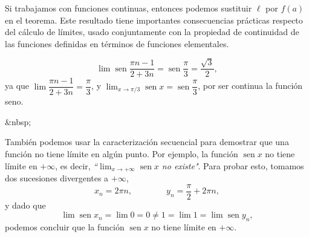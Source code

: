 Si trabajamos con funciones continuas, entonces podemos sustituir $\ell$ por $f(a)$ en el teorema.
Este resultado tiene importantes consecuencias prácticas respecto del cálculo de límites, usado conjuntamente con la propiedad de continuidad de las funciones definidas en términos de funciones elementales.
%
%
\begin{ejemplo}
\[
\lim\operatorname{sen}\dfrac{\pi n-1}{2+3n}=\operatorname{sen}\dfrac{\pi}{3} =\dfrac{\sqrt{3}}{2},
\]
ya que $\lim\dfrac{\pi n-1}{2+3n}=\dfrac{\pi}3$, y $\displaystyle\lim_{x\to\pi/3}\operatorname{sen} x =\operatorname{sen}\dfrac{\pi}{3}$, por ser continua la función seno.
\hfill\fej
\end{ejemplo}
\begin{rawhtml}
&nbsp;
\end{rawhtml}
\begin{ejemplo}
También podemos usar la caracterización secuencial para demostrar que una función no tiene límite en algún punto.
Por ejemplo, la función $\operatorname{sen} x$ no tiene límite en $+\infty$, es decir,
\emph{``$\displaystyle\lim_{x\to+\infty}\operatorname{sen} x$ no
existe"}.
Para probar esto, tomamos dos sucesiones divergentes a $+\infty$,
\[
x_n=2\pi n,\qquad\qquad
y_n=\frac{\pi}{2}+2\pi n,
\]
y dado que
\[
\lim \operatorname{sen} x_n =\lim 0 = 0 \neq 1 = \lim 1 = \lim \operatorname{sen} y_n,
\]
podemos concluir que la función $\operatorname{sen} x$ no tiene límite en $+\infty$.
\fej\end{ejemplo}


